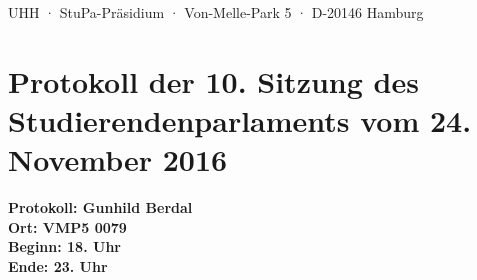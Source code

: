 \documentclass[ngerman,headheight=70pt]{scrartcl}
\begin{document}
    UHH · StuPa-Präsidium · Von-Melle-Park 5 · D-20146 Hamburg

    \section*{Protokoll der 10. Sitzung des Studierendenparlaments vom 24. November 2016}

    \textbf{Protokoll: Gunhild Berdal}\\
    \textbf{Ort: VMP5 0079}\\
    \textbf{Beginn: 18. Uhr}\\
    \textbf{Ende: 23. Uhr}

    \vspace{0.5cm}
\end{document}
